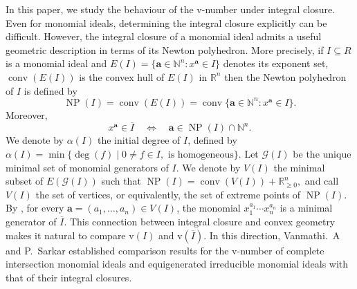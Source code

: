 \documentclass[11pt,reqno,a4paper]{amsart}
\theoremstyle{definition}
\begin{document}
In this paper, we study the behaviour of the $\mathrm{v}$-number under
integral closure. Even for monomial ideals, determining the integral
closure explicitly can be difficult. However, the integral closure of a
monomial ideal admits a useful geometric description in terms of its
Newton polyhedron. More precisely, if $I\subseteq R$ is a monomial ideal
and
\(
E(I)=\{\mathbf{a}\in\mathbb{N}^n : x^{\mathbf{a}}\in I\}
\)
denotes its exponent set, \(\operatorname{conv}(E(I))\) is the convex hull of \(E(I)\) in  \(\mathbb{R}^{n}\) then the Newton polyhedron of $I$ is defined by
\[
\operatorname{NP}(I)
=
\operatorname{conv}(E(I))
=
\operatorname{conv}
\{\mathbf{a}\in\mathbb{N}^n : x^{\mathbf{a}}\in I\}.
\]
Moreover,
\[
x^{\mathbf{a}}\in\overline{I}
\quad\Longleftrightarrow\quad
\mathbf{a}\in\operatorname{NP}(I)\cap\mathbb{N}^n.
\]
We denote by $\alpha(I)$ the initial degree of $I$, defined by
\(
\alpha(I)
=
\min\{\deg(f)\mid 0\neq f\in I , \text{ is homogeneous}\}
\). Let \(\mathcal{G}(I)\) be the unique minimal set of monomial generators of \(I\). We denote by \(V(I)\) the minimal subset of \(E(\mathcal{G}(I))\) such that
\(
\operatorname{NP}(I)=\operatorname{conv}(V(I))+\mathbb{R}_{\geq 0}^{n},
\)
and call \(V(I)\) the set of vertices, or equivalently, the set of extreme points of
\(\operatorname{NP}(I)\). By \cite[ Lemma~2.4]{Hoa22}, for every
\(\mathbf{a}=(a_1,\ldots,a_n)\in V(I)\), the monomial
\(x_1^{a_1}\cdots x_n^{a_n}\) is a minimal generator of
\(\overline{I}\). This connection between integral closure and convex geometry makes it
natural to compare $\mathrm{v}(I)$ and $\mathrm{v}(\overline{I})$.
In this direction, Vanmathi.~A and P.~Sarkar \cite{VanmathiSarkar25}
established comparison results for the $\mathrm{v}$-number of complete
intersection monomial ideals and equigenerated irreducible monomial ideals
with that of their integral closures.
\end{document}
